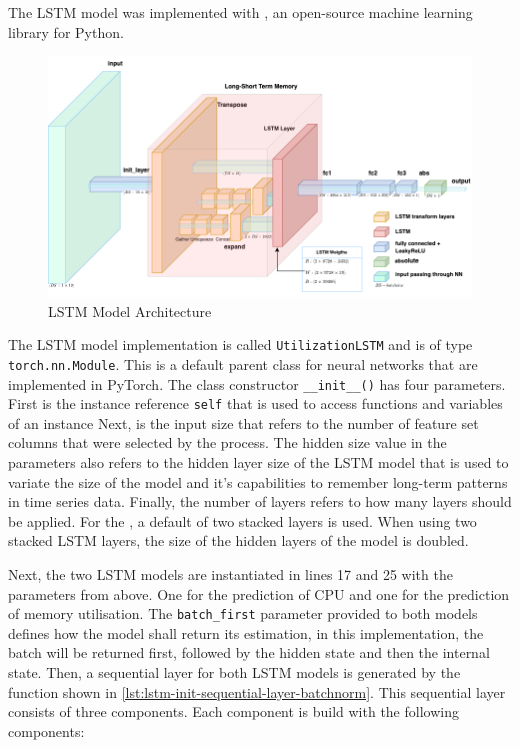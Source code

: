   The LSTM model was implemented with , an open-source machine learning library for Python. 
  \begin{figure}[h!]
    \centering
    \includegraphics[scale=0.5]{figures/current_lstm_model.png}
    \caption{LSTM Model Architecture}
    \label{fig:lstm-model-architecture}
  \end{figure}

  The LSTM model implementation is called \texttt{UtilizationLSTM} and is of type \texttt{torch.nn.Module}. This is a default parent class for neural networks that are implemented in PyTorch.
  The class constructor \texttt{\_\_init\_\_()} has four parameters. First is the instance reference \texttt{self} that is used to access functions and variables of an instance
  Next, is the input size that refers to the number of feature set columns that were selected by the  process.
  The hidden size value in the parameters also refers to the hidden layer size of the LSTM model that is used to variate the size of the model and it's capabilities to remember long-term patterns in time series data.
  Finally, the number of layers refers to how many  layers should be applied.
  For the , a default of two stacked layers is used. When using two stacked LSTM layers, the size of the hidden layers of the model is doubled.
  
  Next, the two LSTM models are instantiated in lines 17 and 25 with the parameters from above. One for the prediction of CPU and one for the prediction of memory utilisation. The \texttt{batch\_first} parameter provided to both models defines how the model shall return its estimation, in this implementation, the batch will be returned first, followed by the hidden state and then the internal state.
  Then, a sequential layer for both LSTM models is generated by the function shown in \ref{lst:lstm-init-sequential-layer-batchnorm}. This sequential layer consists of three components. Each component is build with the following components:
  
